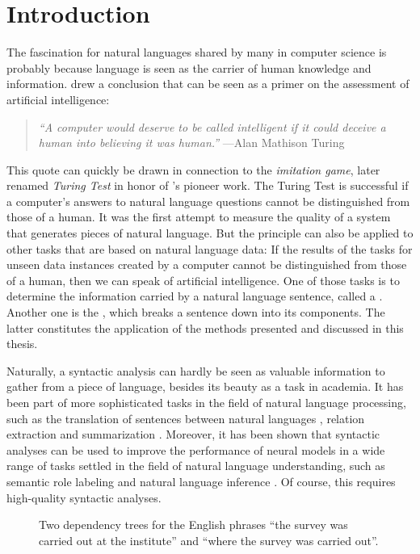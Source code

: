 \documentclass[../document.tex]{subfiles}
\begin{document}
    \chapter{Introduction}
    The fascination for natural languages shared by many in computer science is probably because language is seen as the carrier of human knowledge and information.
     drew a conclusion that can be seen as a primer on the assessment of artificial intelligence:
    \begin{quote}
        \emph{``A computer would deserve to be called intelligent if it could deceive a human into believing it was human.''} \hfill ---Alan Mathison Turing
    \end{quote}
    This quote can quickly be drawn in connection to the \emph{imitation game}, later renamed \emph{Turing Test} in honor of \citeauthor{Turing2009}'s pioneer work.
    The Turing Test is successful if a computer's answers to natural language questions cannot be distinguished from those of a human.
    It was the first attempt to measure the quality of a system that generates pieces of natural language.
    But the principle can also be applied to other tasks that are based on natural language data:
        If the results of the tasks for unseen data instances created by a computer cannot be distinguished from those of a human, then we can speak of artificial intelligence.
    One of those tasks is to determine the information carried by a natural language sentence, called a .
    Another one is the , which breaks a sentence down into its components.
    The latter constitutes the application of the methods presented and discussed in this thesis.

    Naturally, a syntactic analysis can hardly be seen as valuable information to gather from a piece of language, besides its beauty as a task in academia.
    It has been part of more sophisticated tasks in the field of natural language processing, such as the translation of sentences between natural languages \citep{Zhang19,Yang22}, relation extraction \citep{Ngu19} and summarization \citep{Bal21}.
    Moreover, it has been shown that syntactic analyses can be used to improve the performance of neural models in a wide range of tasks settled in the field of natural language understanding, such as semantic role labeling and natural language inference \citep{Liu19, Wang19, Fei20}.
    Of course, this requires high-quality syntactic analyses.

    \begin{figure}
        \null\hfill
        
        \hfill
        
        \hfill\null
        \caption{\label{fig:dependency}
            Two dependency trees for the English phrases ``the survey was carried out at the institute'' and ``where the survey was carried out''.
        }
    \end{figure}
\end{document}
